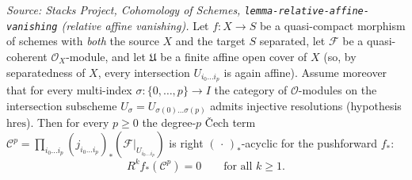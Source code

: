\begin{lemma}
  \label{lem:cech_term_pushforward_acyclic}
  \textit{Source: Stacks Project, Cohomology of Schemes,
  \texttt{lemma-relative-affine-vanishing} (relative affine vanishing).}
  Let \(f : X \to S\) be a quasi-compact morphism of schemes with \emph{both} the
  source \(X\) and the target \(S\) separated, let \(\mathcal{F}\) be a
  quasi-coherent \(\mathcal{O}_X\)-module, and let \(\mathfrak{U}\) be a finite
  affine open cover of \(X\) (so, by separatedness of \(X\), every intersection
  \(U_{i_0 \ldots i_p}\) is again affine). Assume moreover that for every
  multi-index \(\sigma : \{0, \ldots, p\} \to I\) the category of
  \(\mathcal{O}\)-modules on the intersection subscheme
  \(U_\sigma = U_{\sigma(0) \ldots \sigma(p)}\) admits injective resolutions
  (hypothesis \(\mathrm{hres}\)). Then for every \(p \geq 0\) the degree-\(p\)
  {\v C}ech term \(\mathcal{C}^p =
  \prod_{i_0 \ldots i_p} (j_{i_0 \ldots i_p})_*(\mathcal{F}|_{U_{i_0 \ldots i_p}})\)
  is right \((\,\cdot\,)_*\)-acyclic for the pushforward \(f_*\):
  \[
    R^k f_*(\mathcal{C}^p) = 0
      \qquad \text{for all } k \geq 1.
  \]


\end{lemma}
